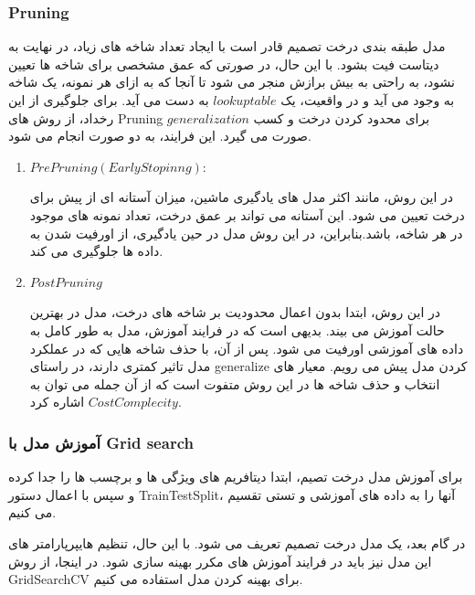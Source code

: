 \documentclass{article}
\begin{document}
\subsubsection{Pruning}
مدل طبقه بندی درخت تصمیم قادر است با ایجاد تعداد شاخه های زیاد، در نهایت به دیتاست فیت بشود. با این حال، در صورتی که عمق مشخصی برای شاخه ها تعیین نشود، به راحتی به بیش برازش منجر می شود تا آنجا که به ازای هر نمونه، یک شاخه به وجود می آید و در واقعیت، یک $lookup table$ به دست می آید.
برای جلوگیری از این رخداد، از روش های Pruning برای محدود کردن درخت و کسب $generalization$ صورت می گیرد.
این فرایند، به دو صورت انجام می شود.
\begin{enumerate}
    \item $Pre Pruning (Early Stopinng)$: 

    در این روش، مانند اکثر مدل های یادگیری ماشین، میزان آستانه ای از پیش برای درخت تعیین می شود. این آستانه می تواند بر عمق درخت، تعداد نمونه های موجود در هر شاخه، باشد.بنابراین، در این روش مدل در حین یادگیری، از اورفیت شدن به داده ها جلوگیری می کند.

    \item $Post Pruning$

    در این روش، ابتدا بدون اعمال محدودیت بر شاخه های درخت، مدل در بهترین حالت آموزش می بیند. بدیهی است که در  فرایند آموزش، مدل به طور کامل به داده های آموزشی اورفیت می شود. پس از آن، با حذف شاخه هایی که در عملکرد مدل تاثیر کمتری دارند، در راستای generalize کردن مدل پیش می رویم. معیار های انتخاب و حذف شاخه ها در این روش متفوت است که از آن جمله می توان به  $Cost Complecity$ اشاره کرد.
    
\end{enumerate}

\subsubsection{آموزش مدل با Grid search}
برای آموزش مدل درخت تصیم، ابتدا دیتافریم های ویژگی ها و برچسب ها را جدا کرده و سپس با اعمال دستور TrainTestSplit، آنها را به داده های آموزشی و تستی تقسیم می کنیم. 

در گام بعد، یک مدل درخت تصمیم تعریف می شود. با این حال، تنظیم هایپرپارامتر های این مدل نیز باید در فرایند آموزش های مکرر بهینه سازی شود. در اینجا، از روش GridSearchCV برای بهینه کردن مدل استفاده می کنیم.
\end{document}
